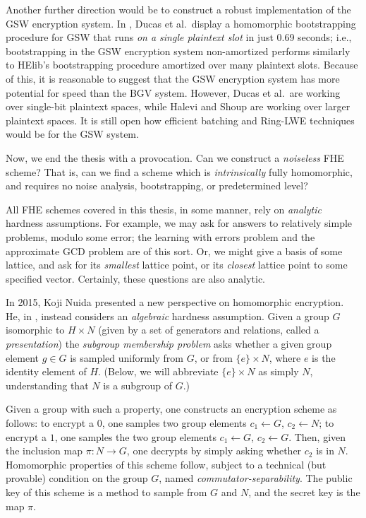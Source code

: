     Another further direction would be to construct a robust implementation of the GSW encryption system. In \cite{Ducas2015}, Ducas et al.~display a homomorphic bootstrapping procedure for GSW that runs \emph{on a single plaintext slot} in just 0.69 seconds; i.e., bootstrapping in the GSW encryption system non-amortized performs similarly to HElib's bootstrapping procedure amortized over many plaintext slots. Because of this, it is reasonable to suggest that the GSW encryption system has more potential for speed than the BGV system. However, Ducas et al.~are working over single-bit plaintext spaces, while Halevi and Shoup are working over larger plaintext spaces. It is still open how efficient batching and Ring-LWE techniques would be for the GSW system.

    Now, we end the thesis with a provocation. Can we construct a \emph{noiseless} FHE scheme? That is, can we find a scheme which is \emph{intrinsically} fully homomorphic, and requires no noise analysis, bootstrapping, or predetermined level?

    All FHE schemes covered in this thesis, in some manner, rely on \emph{analytic} hardness assumptions. For example, we may ask for answers to relatively simple problems, modulo some error; the learning with errors problem and the approximate GCD problem are of this sort. Or, we might give a basis of some lattice, and ask for its \emph{smallest} lattice point, or its \emph{closest} lattice point to some specified vector. Certainly, these questions are also analytic.

    In 2015, Koji Nuida presented a new perspective on homomorphic encryption. He, in \cite{nuida15}, instead considers an \emph{algebraic} hardness assumption. Given a group $G$ isomorphic to $H \times N$ (given by a set of generators and relations, called a \emph{presentation}) the \emph{subgroup membership problem} asks whether a given group element $g \in G$ is sampled uniformly from $G$, or from $\{e\} \times N$, where $e$ is the identity element of $H$. (Below, we will abbreviate $\{e\} \times N$ as simply $N$, understanding that $N$ is a subgroup of $G$.)

    Given a group with such a property, one constructs an encryption scheme as follows: to encrypt a $0$, one samples two group elements $c_1 \leftarrow G$, $c_2 \leftarrow N$; to encrypt a $1$, one samples the two group elements $c_1 \leftarrow G$, $c_2 \leftarrow G$. Then, given the inclusion map $\pi: N \to G$, one decrypts by simply asking whether $c_2$ is in $N$. Homomorphic properties of this scheme follow, subject to a technical (but provable) condition on the group $G$, named \emph{commutator-separability}. The public key of this scheme is a method to sample from $G$ and $N$, and the secret key is the map $\pi$.

